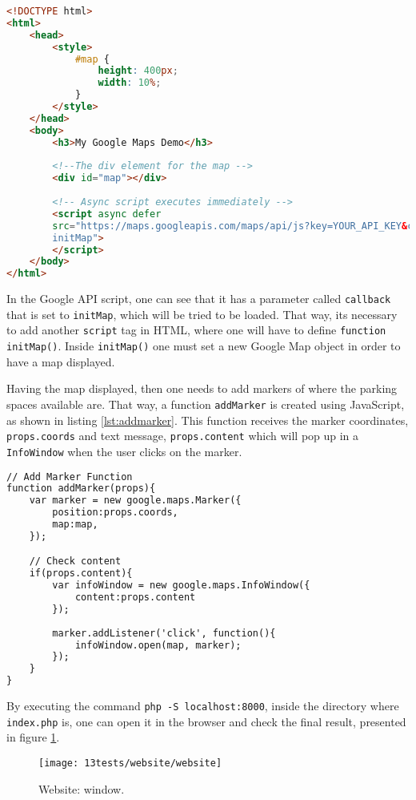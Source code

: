 \begin{lstlisting}[language=HTML, caption={Website: Adding a map with a marker.},label={lst:website}]
<!DOCTYPE html>
<html>
	<head>
		<style>
			#map {
				height: 400px;
				width: 10%;
			}
		</style>
	</head>
	<body>
		<h3>My Google Maps Demo</h3>
		
		<!--The div element for the map -->
		<div id="map"></div>
		
		<!-- Async script executes immediately -->
		<script async defer
		src="https://maps.googleapis.com/maps/api/js?key=YOUR_API_KEY&callback=
		initMap">
		</script>
	</body>
</html>
\end{lstlisting}

In the Google API script, one can see that it has a parameter called \verb|callback| that is set to \verb|initMap|, which will be tried to be loaded. That way, its necessary to add another \verb|script| tag in HTML, where one will have to define \verb|function initMap()|. Inside \verb|initMap()| one must set a new Google Map object in order to have a map displayed.

Having the map displayed, then one needs to add markers of where the parking spaces available are. That way, a function \verb|addMarker| is created using JavaScript, as shown in listing \ref{lst:addmarker}. This function receives the marker coordinates, \verb|props.coords| and text message, \verb|props.content| which will pop up in a \verb|InfoWindow| when the user clicks on the marker.

\begin{lstlisting}[language=HTML, caption={Website: Function for adding a marker.},label={lst:addmarker}]
// Add Marker Function
function addMarker(props){
	var marker = new google.maps.Marker({
		position:props.coords,
		map:map,
	});

	// Check content
	if(props.content){
		var infoWindow = new google.maps.InfoWindow({
			content:props.content
		});
		
		marker.addListener('click', function(){
			infoWindow.open(map, marker);
		});
	}
}
\end{lstlisting}

By executing the command \verb|php -S localhost:8000|, inside the directory where \verb|index.php| is, one can open it in the browser and check the final result, presented in figure \ref{fig:websiteWindow}.

\begin{figure}[H]
	\centering	
	\texttt{[image: 13tests/website/website]}
	\caption{Website: window.}
	\label{fig:websiteWindow}
\end{figure}

